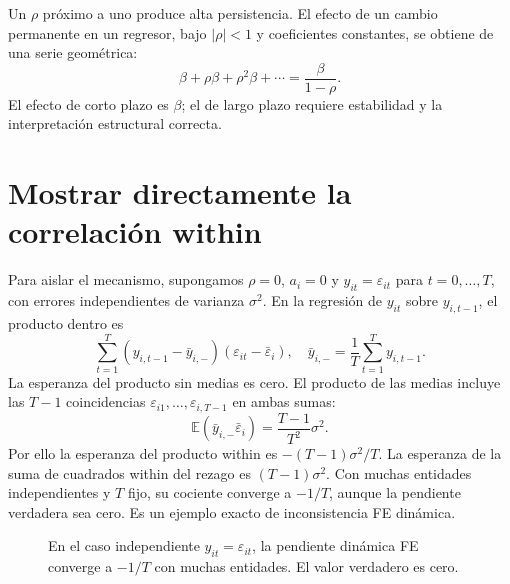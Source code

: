\documentclass[11pt,a4paper]{article}
\newcommand{\E}{\mathbb E}
\theoremstyle{definition}
\newcommand{\eps}{\varepsilon}
\begin{document}
Un $\rho$ próximo a uno produce alta persistencia. El efecto de un cambio permanente en un regresor, bajo $|\rho|<1$ y coeficientes constantes, se obtiene de una serie geométrica:
\[
\beta+\rho\beta+\rho^2\beta+\cdots=\frac{\beta}{1-\rho}.
\]
El efecto de corto plazo es $\beta$; el de largo plazo requiere estabilidad y la interpretación estructural correcta.

\section{Mostrar directamente la correlación within}
Para aislar el mecanismo, supongamos $\rho=0$, $a_i=0$ y
$y_{it}=\eps_{it}$ para $t=0,\ldots,T$, con errores independientes de varianza $\sigma^2$.
En la regresión de $y_{it}$ sobre $y_{i,t-1}$, el producto dentro es
\[
\sum_{t=1}^T
(y_{i,t-1}-\bar y_{i,-})(\eps_{it}-\bar\eps_i),
\quad
\bar y_{i,-}=\frac1T\sum_{t=1}^Ty_{i,t-1}.
\]
La esperanza del producto sin medias es cero.
El producto de las medias incluye las $T-1$ coincidencias
$\eps_{i1},\ldots,\eps_{i,T-1}$ en ambas sumas:
\[
\E(\bar y_{i,-}\bar\eps_i)=\frac{T-1}{T^2}\sigma^2.
\]
Por ello la esperanza del producto within es
$-(T-1)\sigma^2/T$.
La esperanza de la suma de cuadrados within del rezago es $(T-1)\sigma^2$.
Con muchas entidades independientes y $T$ fijo, su cociente converge a $-1/T$, aunque la pendiente verdadera sea cero. Es un ejemplo exacto de inconsistencia FE dinámica.



\begin{figure}[htbp]\centering
{}
\caption{En el caso independiente $y_{it}=\eps_{it}$, la pendiente dinámica FE converge a $-1/T$ con muchas entidades. El valor verdadero es cero.}\label{fig:panel-13}
\end{figure}
\end{document}
